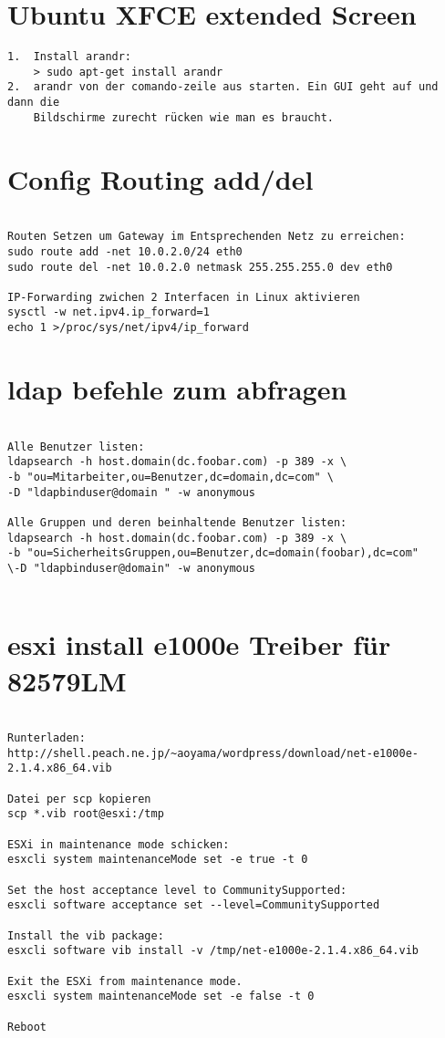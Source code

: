\documentclass[a4paper,10pt]{report}
\begin{document}
\section{Ubuntu XFCE extended Screen}
\begin{verbatim}
1.  Install arandr:
    > sudo apt-get install arandr
2.  arandr von der comando-zeile aus starten. Ein GUI geht auf und dann die 
    Bildschirme zurecht rücken wie man es braucht.
\end{verbatim}
\pagebreak
\section{Config Routing add/del}
\begin{verbatim}
 
Routen Setzen um Gateway im Entsprechenden Netz zu erreichen:
sudo route add -net 10.0.2.0/24 eth0
sudo route del -net 10.0.2.0 netmask 255.255.255.0 dev eth0

IP-Forwarding zwichen 2 Interfacen in Linux aktivieren
sysctl -w net.ipv4.ip_forward=1
echo 1 >/proc/sys/net/ipv4/ip_forward

\end{verbatim}



\section{ldap befehle zum abfragen}
\begin{verbatim}
 
Alle Benutzer listen:
ldapsearch -h host.domain(dc.foobar.com) -p 389 -x \
-b "ou=Mitarbeiter,ou=Benutzer,dc=domain,dc=com" \
-D "ldapbinduser@domain	" -w anonymous

Alle Gruppen und deren beinhaltende Benutzer listen:
ldapsearch -h host.domain(dc.foobar.com) -p 389 -x \
-b "ou=SicherheitsGruppen,ou=Benutzer,dc=domain(foobar),dc=com" 
\-D "ldapbinduser@domain" -w anonymous


\end{verbatim}
\section{esxi install e1000e Treiber für 82579LM}
\begin{verbatim}
 
Runterladen:
http://shell.peach.ne.jp/~aoyama/wordpress/download/net-e1000e-2.1.4.x86_64.vib

Datei per scp kopieren
scp *.vib root@esxi:/tmp

ESXi in maintenance mode schicken:
esxcli system maintenanceMode set -e true -t 0

Set the host acceptance level to CommunitySupported:
esxcli software acceptance set --level=CommunitySupported

Install the vib package:
esxcli software vib install -v /tmp/net-e1000e-2.1.4.x86_64.vib

Exit the ESXi from maintenance mode.
esxcli system maintenanceMode set -e false -t 0

Reboot

\end{verbatim}
\end{document}

